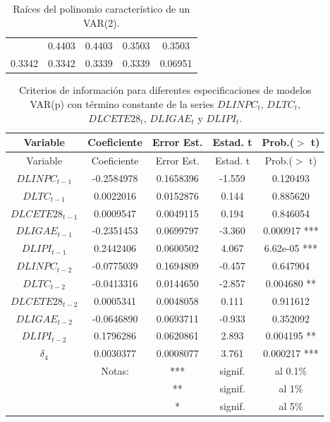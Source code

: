 \documentclass[
]{book}
\begin{document}
\begin{longtable}[]{@{}ccccc@{}}
\caption{\label{tab:RootsVAR} Raíces del polinomio característico de un VAR(2).}\tabularnewline
\toprule\noalign{}
\endfirsthead
\endhead
\bottomrule\noalign{}
\endlastfoot
0.7452 & 0.4403 & 0.4403 & 0.3503 & 0.3503 \\
0.3342 & 0.3342 & 0.3339 & 0.3339 & 0.06951 \\
\end{longtable}

\begin{longtable}[]{@{}ccccc@{}}
\caption{\label{tab:IGAEVAR} Criterios de información para diferentes especificaciones de modelos VAR(p) con término constante de la series \(DLINPC_t\), \(DLTC_t\), \(DLCETE28_t\), \(DLIGAE_t\) y \(DLIPI_t\).}\tabularnewline
\toprule\noalign{}
Variable & Coeficiente & Error Est. & Estad. t & Prob.(\(>\) t) \\
\midrule\noalign{}
\endfirsthead
\toprule\noalign{}
Variable & Coeficiente & Error Est. & Estad. t & Prob.(\(>\) t) \\
\midrule\noalign{}
\endhead
\bottomrule\noalign{}
\endlastfoot
\(DLINPC_{t-1}\) & -0.2584978 & 0.1658396 & -1.559 & 0.120493 \\
\(DLTC_{t-1}\) & 0.0022016 & 0.0152876 & 0.144 & 0.885620 \\
\(DLCETE28_{t-1}\) & 0.0009547 & 0.0049115 & 0.194 & 0.846054 \\
\(DLIGAE_{t-1}\) & -0.2351453 & 0.0699797 & -3.360 & 0.000917 *** \\
\(DLIPI_{t-1}\) & 0.2442406 & 0.0600502 & 4.067 & 6.62e-05 *** \\
\(DLINPC_{t-2}\) & -0.0775039 & 0.1694809 & -0.457 & 0.647904 \\
\(DLTC_{t-2}\) & -0.0413316 & 0.0144650 & -2.857 & 0.004680 ** \\
\(DLCETE28_{t-2}\) & 0.0005341 & 0.0048058 & 0.111 & 0.911612 \\
\(DLIGAE_{t-2}\) & -0.0646890 & 0.0693711 & -0.933 & 0.352092 \\
\(DLIPI_{t-2}\) & 0.1796286 & 0.0620861 & 2.893 & 0.004195 ** \\
\(\delta_4\) & 0.0030377 & 0.0008077 & 3.761 & 0.000217 *** \\
& Notas: & *** & signif. & al 0.1\% \\
& & ** & signif. & al 1\% \\
& & * & signif. & al 5\% \\
\end{longtable}
\end{document}
